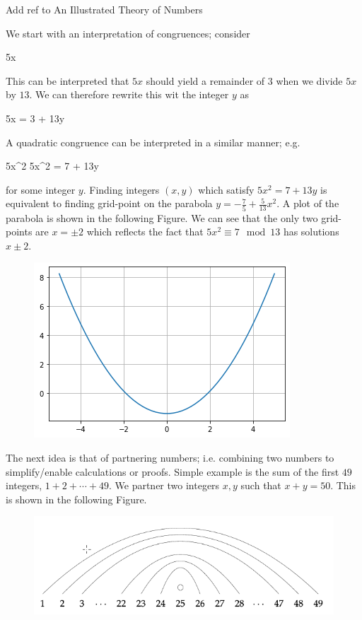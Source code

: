 
Add ref to An Illustrated Theory of Numbers

We start with an interpretation of congruences; consider

\bee
5x  
\eee

This can be interpreted that $5x$ should yield a remainder of $3$ when we divide $5x$ by $13$. We can therefore rewrite this wit the integer $y$ as

\bee
5x = 3 + 13y
\eee

A quadratic congruence can be interpreted in a similar manner; e.g.

\bee
5x^2   \leftrightarrow 5x^2 = 7 + 13y
\eee

for some integer $y$. Finding integers $(x,y)$ which satisfy $5x^2 = 7 + 13y$ is equivalent to finding grid-point on the parabola $y = - \frac{7}{5} + \frac{5}{13}x^2$. A plot of the parabola is shown in the following Figure. We can see that the only two grid-points are $x = \pm 2$ which reflects the fact that $5x^2 \equiv 7 \mod 13$ has solutions $x \pm 2$.

\begin{figure}[H]
    \centering
    \includegraphics[scale=0.75]{images/2023-02-22-quadr_con_01.png}
\end{figure}

The next idea is that of partnering numbers; i.e. combining two numbers to simplify/enable calculations or proofs. Simple example is the sum of the first $49$ integers, $1 + 2 + \cdots + 49$. We partner two integers $x, y$ such that $x + y = 50$. This is shown in the following Figure.

\begin{figure}[H]
    \centering
    \includegraphics[scale=0.75]{images/2023-02-22-quadr_con_02.png}
\end{figure}

